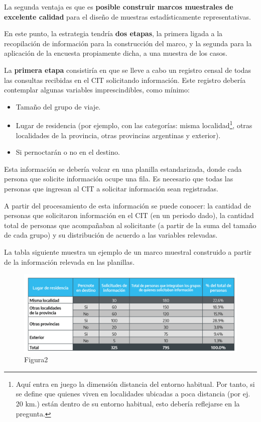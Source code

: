 \documentclass[
]{book}
\begin{document}
La segunda ventaja es que es \textbf{posible construir marcos muestrales de excelente calidad} para el diseño de muestras estadísticamente representativas.

En este punto, la estrategia tendría \textbf{dos etapas}, la primera ligada a la recopilación de información para la construcción del marco, y la segunda para la aplicación de la encuesta propiamente dicha, a una muestra de los casos.

La \textbf{primera etapa} consistiría en que se lleve a cabo un registro censal de todas las consultas recibidas en el CIT solicitando información. Este registro debería contemplar algunas variables imprescindibles, como mínimo:

\begin{itemize}
\item
  Tamaño del grupo de viaje.
\item
  Lugar de residencia (por ejemplo, con las categorías: misma localidad\footnote{Aquí entra en juego la dimensión distancia del entorno habitual. Por tanto, si se define que quienes viven en localidades ubicadas a poca distancia (por ej. 20 km.) están dentro de su entorno habitual, esto debería reflejarse en la pregunta.}, otras localidades de la provincia, otras provincias argentinas y exterior).
\item
  Si pernoctarán o no en el destino.\\
\end{itemize}

Esta información se debería volcar en una planilla estandarizada, donde cada persona que solicite información ocupe una fila. Es necesario que todas las personas que ingresan al CIT a solicitar información sean registradas.

A partir del procesamiento de esta información se puede conocer: la cantidad de personas que solicitaron información en el CIT (en un periodo dado), la cantidad total de personas que acompañaban al solicitante (a partir de la suma del tamaño de cada grupo) y su distribución de acuerdo a las variables relevadas.

\hfill\break
La tabla siguiente muestra un ejemplo de un marco muestral construido a partir de la información relevada en las planillas.

\begin{figure}
\includegraphics[width=1\linewidth]{imagenes/figura_2} \caption{Figura2}\label{fig:Lugarderesidencia}
\end{figure}
\end{document}
